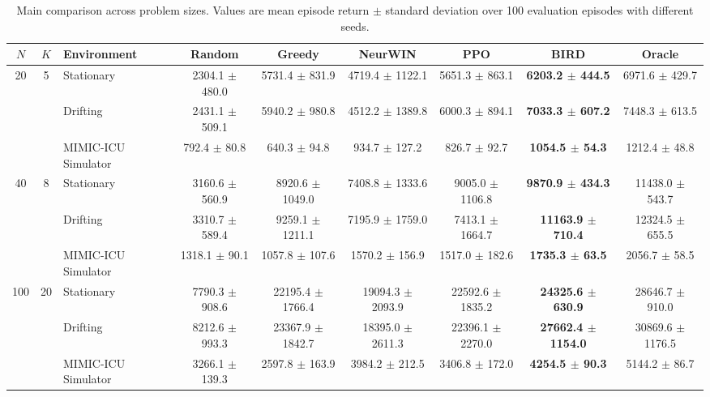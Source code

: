 \begin{table}[t]
  \centering
  \caption{Main comparison across problem sizes. Values are mean episode return \(\pm\) standard deviation over 100 evaluation episodes with different seeds.}
  \label{tab:main-comparison-all-sizes}
  \scriptsize
  \begin{tabular}{cclcccccc}
    \toprule
    \(N\) & \(K\) & Environment & Random & Greedy & NeurWIN & PPO & BIRD & Oracle \\
    \midrule
    20 & 5 & Stationary & 2304.1 $\pm$ 480.0 & 5731.4 $\pm$ 831.9 & 4719.4 $\pm$ 1122.1 & 5651.3 $\pm$ 863.1 & \textbf{6203.2 $\pm$ 444.5} & 6971.6 $\pm$ 429.7 \\
     &  & Drifting & 2431.1 $\pm$ 509.1 & 5940.2 $\pm$ 980.8 & 4512.2 $\pm$ 1389.8 & 6000.3 $\pm$ 894.1 & \textbf{7033.3 $\pm$ 607.2} & 7448.3 $\pm$ 613.5 \\
     &  & MIMIC-ICU Simulator & 792.4 $\pm$ 80.8 & 640.3 $\pm$ 94.8 & 934.7 $\pm$ 127.2 & 826.7 $\pm$ 92.7 & \textbf{1054.5 $\pm$ 54.3} & 1212.4 $\pm$ 48.8 \\
    \midrule
    40 & 8 & Stationary & 3160.6 $\pm$ 560.9 & 8920.6 $\pm$ 1049.0 & 7408.8 $\pm$ 1333.6 & 9005.0 $\pm$ 1106.8 & \textbf{9870.9 $\pm$ 434.3} & 11438.0 $\pm$ 543.7 \\
     &  & Drifting & 3310.7 $\pm$ 589.4 & 9259.1 $\pm$ 1211.1 & 7195.9 $\pm$ 1759.0 & 7413.1 $\pm$ 1664.7 & \textbf{11163.9 $\pm$ 710.4} & 12324.5 $\pm$ 655.5 \\
     &  & MIMIC-ICU Simulator & 1318.1 $\pm$ 90.1 & 1057.8 $\pm$ 107.6 & 1570.2 $\pm$ 156.9 & 1517.0 $\pm$ 182.6 & \textbf{1735.3 $\pm$ 63.5} & 2056.7 $\pm$ 58.5 \\
    \midrule
    100 & 20 & Stationary & 7790.3 $\pm$ 908.6 & 22195.4 $\pm$ 1766.4 & 19094.3 $\pm$ 2093.9 & 22592.6 $\pm$ 1835.2 & \textbf{24325.6 $\pm$ 630.9} & 28646.7 $\pm$ 910.0 \\
     &  & Drifting & 8212.6 $\pm$ 993.3 & 23367.9 $\pm$ 1842.7 & 18395.0 $\pm$ 2611.3 & 22396.1 $\pm$ 2270.0 & \textbf{27662.4 $\pm$ 1154.0} & 30869.6 $\pm$ 1176.5 \\
     &  & MIMIC-ICU Simulator & 3266.1 $\pm$ 139.3 & 2597.8 $\pm$ 163.9 & 3984.2 $\pm$ 212.5 & 3406.8 $\pm$ 172.0 & \textbf{4254.5 $\pm$ 90.3} & 5144.2 $\pm$ 86.7 \\
    \bottomrule
  \end{tabular}
\end{table}

